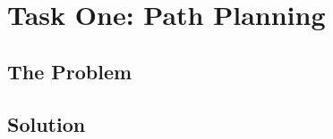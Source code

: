 \chapter{Task One: Path Planning}
\label{task1}

\ifpdf
    \graphicspath{{Chapter3/Figs/Raster/}{Chapter3/Figs/PDF/}{Chapter3/Figs/}}
\else
    \graphicspath{{Chapter3/Figs/Vector/}{Chapter3/Figs/}}
\fi

\section{The Problem}
\label{task1:description}


\section{Solution}
\label{task1:solution}